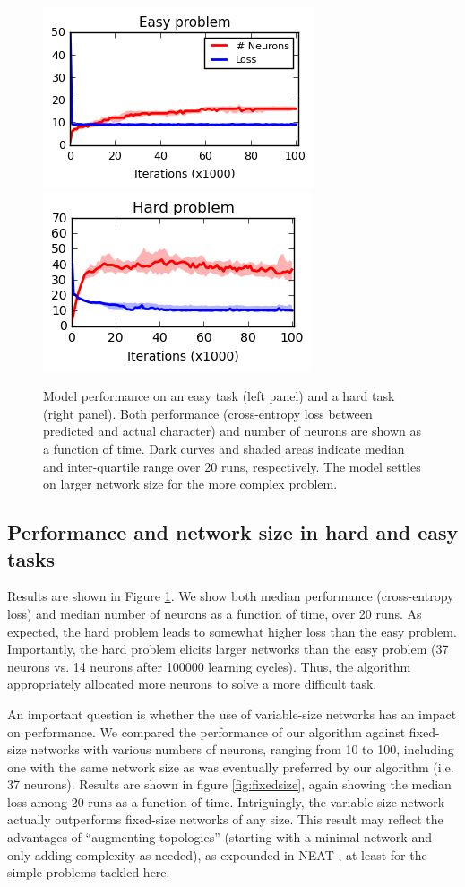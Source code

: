 \documentclass{article}
\begin{document}
\begin{figure}[ht]
\label{fig:easyandhard}
  \centering
\includegraphics[scale=0.9]{figE.png}
\includegraphics[scale=0.9]{figH.png}
  \caption{Model performance on an easy task (left panel) and a hard task
(right panel). Both performance (cross-entropy loss between predicted and
actual character) and number of neurons are shown as a function of time. Dark curves and shaded areas indicate median and inter-quartile range over 20 runs, respectively. The
model settles on larger network size for the more complex problem. }
\end{figure}


\subsection{Performance and network size in hard and easy tasks}


Results are shown in Figure \ref{fig:easyandhard}. We show both median
performance (cross-entropy loss) and median number of neurons as a function of
time, over 20 runs. As expected, the hard problem leads to somewhat higher loss
than the easy problem. Importantly, the hard problem elicits larger networks
than the easy problem (37 neurons vs. 14 neurons after 100000 learning cycles).
Thus, the algorithm appropriately allocated more neurons to solve a more difficult
task.

An important question is whether the use of variable-size networks has an
impact on performance. We compared the performance of our algorithm against
fixed-size networks with various numbers of neurons, ranging from 10 to 100,
including one with the same network size as was eventually preferred by our
algorithm (i.e. 37 neurons).  Results are shown in figure \ref{fig:fixedsize},
again showing the median loss among 20 runs as a function of time.
Intriguingly, the variable-size network actually outperforms fixed-size
networks of any size. This result may reflect the advantages of  ``augmenting
topologies'' (starting with a minimal network and only adding complexity as
needed), as expounded in NEAT \cite{Stanley2002-ug}, at least for the simple
problems tackled here.
\end{document}
